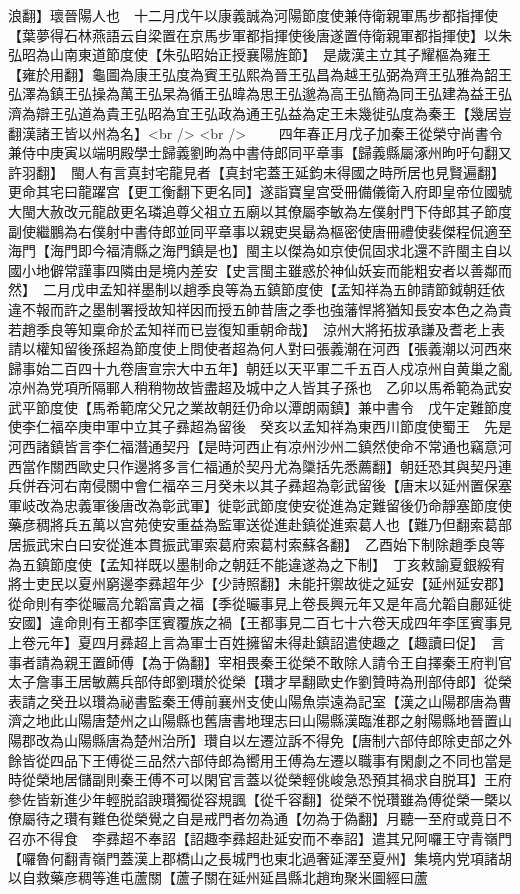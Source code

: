 浪翻】瓌晉陽人也　十二月戊午以康義誠為河陽節度使兼侍衛親軍馬步都指揮使【葉夢得石林燕語云自梁置在京馬步軍都指揮使後唐遂置侍衛親軍都指揮使】以朱弘昭為山南東道節度使【朱弘昭始正授襄陽旌節】　是歲漢主立其子耀樞為雍王【雍於用翻】龜圖為康王弘度為賓王弘熙為晉王弘昌為越王弘弼為齊王弘雅為韶王弘澤為鎮王弘操為萬王弘杲為循王弘暐為思王弘邈為高王弘簡為同王弘建為益王弘濟為辯王弘道為貴王弘昭為宜王弘政為通王弘益為定王未幾徙弘度為秦王【幾居豈翻漢諸王皆以州為名】<br />
<br />
　　四年春正月戊子加秦王從榮守尚書令兼侍中庚寅以端明殿學士歸義劉昫為中書侍郎同平章事【歸義縣屬涿州昫吁句翻又許羽翻】　閩人有言真封宅龍見者【真封宅蓋王延鈞未得國之時所居也見賢遍翻】更命其宅曰龍躍宫【更工衡翻下更名同】遂詣寶皇宫受冊備儀衛入府即皇帝位國號大閩大赦改元龍啟更名璘追尊父祖立五廟以其僚屬李敏為左僕射門下侍郎其子節度副使繼鵬為右僕射中書侍郎並同平章事以親吏吳朂為樞密使唐冊禮使裴傑程侃適至海門【海門即今福清縣之海門鎮是也】閩主以傑為如京使侃固求北還不許閩主自以國小地僻常謹事四隣由是境内差安【史言閩主雖惑於神仙妖妄而能粗安者以善鄰而然】　二月戊申孟知祥墨制以趙季良等為五鎮節度使【孟知祥為五帥請節鉞朝廷依違不報而許之墨制署授故知祥因而授五帥昔唐之季也強藩悍將猶知長安本色之為貴若趙季良等知稟命於孟知祥而已豈復知重朝命哉】　涼州大將拓拔承謙及耆老上表請以權知留後孫超為節度使上問使者超為何人對曰張義潮在河西【張義潮以河西來歸事始二百四十九卷唐宣宗大中五年】朝廷以天平軍二千五百人戍凉州自黄巢之亂凉州為党項所隔鄆人稍稍物故皆盡超及城中之人皆其子孫也　乙卯以馬希範為武安武平節度使【馬希範席父兄之業故朝廷仍命以潭朗兩鎮】兼中書令　戊午定難節度使李仁福卒庚申軍中立其子彞超為留後　癸亥以孟知祥為東西川節度使蜀王　先是河西諸鎮皆言李仁福潛通契丹【是時河西止有凉州沙州二鎮然使命不常通也竊意河西當作關西歐史只作邊將多言仁福通於契丹尤為櫽括先悉薦翻】朝廷恐其與契丹連兵併吞河右南侵關中會仁福卒三月癸未以其子彞超為彰武留後【唐末以延州置保塞軍岐改為忠義軍後唐改為彰武軍】徙彰武節度使安從進為定難留後仍命靜塞節度使藥彦稠將兵五萬以宫苑使安重益為監軍送從進赴鎮從進索葛人也【難乃但翻索葛部居振武宋白曰安從進本貫振武軍索葛府索葛村索蘇各翻】　乙酉始下制除趙季良等為五鎮節度使【孟知祥既以墨制命之朝廷不能違遂為之下制】　丁亥敕諭夏銀綏宥將士吏民以夏州窮邊李彞超年少【少詩照翻】未能扞禦故徙之延安【延州延安郡】從命則有李從曮高允韜富貴之福【季從曮事見上卷長興元年又是年高允韜自鄜延徙安國】違命則有王都李匡賓覆族之禍【王都事見二百七十六卷天成四年李匡賓事見上卷元年】夏四月彞超上言為軍士百姓擁留未得赴鎮詔遣使趣之【趣讀曰促】　言事者請為親王置師傅【為于偽翻】宰相畏秦王從榮不敢除人請令王自擇秦王府判官太子詹事王居敏薦兵部侍郎劉瓚於從榮【瓚才旱翻歐史作劉贊時為刑部侍郎】從榮表請之癸丑以瓚為祕書監秦王傅前襄州支使山陽魚崇遠為記室【漢之山陽郡唐為曹濟之地此山陽唐楚州之山陽縣也舊唐書地理志曰山陽縣漢臨淮郡之射陽縣地晉置山陽郡改為山陽縣唐為楚州治所】瓚自以左遷泣訴不得免【唐制六部侍郎除吏部之外餘皆從四品下王傅從三品然六部侍郎為嚮用王傅為左遷以職事有閑劇之不同也當是時從榮地居儲副則秦王傅不可以閑官言蓋以從榮輕佻峻急恐預其禍求自脱耳】王府參佐皆新進少年輕脱諂諛瓚獨從容規諷【從千容翻】從榮不悦瓚雖為傅從榮一槩以僚屬待之瓚有難色從榮覺之自是戒門者勿為通【勿為于偽翻】月聽一至府或竟日不召亦不得食　李彞超不奉詔【詔趣李彞超赴延安而不奉詔】遣其兄阿囉王守青嶺門【囉魯何翻青嶺門蓋漢上郡橋山之長城門也東北過奢延澤至夏州】集境内党項諸胡以自救藥彦稠等進屯蘆關【蘆子關在延州延昌縣北趙珣聚米圖經曰蘆